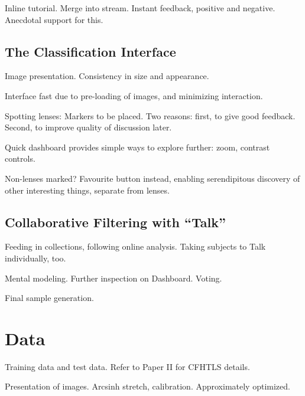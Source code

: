 \documentclass[useAMS,usenatbib,a4paper]{mn2e}
\begin{document}
Inline tutorial. Merge into stream. Instant feedback, positive and
negative. Anecdotal support for this.



\subsection{The Classification Interface}
\label{sec:design:classification}

Image presentation. Consistency in size and appearance. 

Interface fast due to pre-loading of images, and minimizing interaction.

Spotting lenses: Markers to be placed. Two reasons: first, to give good
feedback. Second, to improve quality of discussion later.

Quick dashboard provides simple ways to explore further: zoom, contrast
controls.

Non-lenses marked? Favourite button instead, enabling serendipitous
discovery of other interesting things, separate from lenses.



\subsection{Collaborative Filtering with ``Talk''}
\label{sec:design:classification}

Feeding in collections, following online analysis. 
Taking subjects to Talk individually, too.

Mental modeling. Further inspection on Dashboard. Voting. 

Final sample generation.



\section{Data}
\label{sec:data}

Training data and test data. Refer to Paper II for CFHTLS details.

Presentation of images. Arcsinh stretch, calibration. Approximately
optimized.


\end{document}
